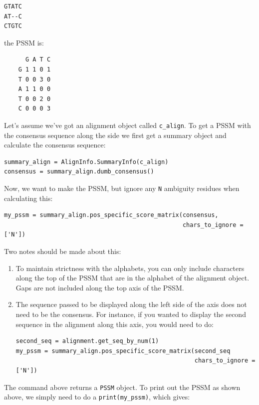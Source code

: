 \documentclass{report}
\begin{document}
\begin{verbatim}
GTATC
AT--C
CTGTC
\end{verbatim}

\noindent the PSSM is:

\begin{verbatim}
      G A T C
    G 1 1 0 1
    T 0 0 3 0
    A 1 1 0 0
    T 0 0 2 0
    C 0 0 0 3
\end{verbatim}

Let's assume we've got an alignment object called \verb|c_align|. To get a PSSM with the consensus sequence along the side we first get a summary object and calculate the consensus sequence:

\begin{verbatim}
summary_align = AlignInfo.SummaryInfo(c_align)
consensus = summary_align.dumb_consensus()
\end{verbatim}

Now, we want to make the PSSM, but ignore any \verb|N| ambiguity residues when calculating this:

\begin{verbatim}
my_pssm = summary_align.pos_specific_score_matrix(consensus,
                                                  chars_to_ignore = ['N'])
\end{verbatim}

Two notes should be made about this:

\begin{enumerate}
  \item To maintain strictness with the alphabets, you can only include characters along the top of the PSSM that are in the alphabet of the alignment object. Gaps are not included along the top axis of the PSSM.

  \item The sequence passed to be displayed along the left side of the axis does not need to be the consensus. For instance, if you wanted to display the second sequence in  the alignment along this axis, you would need to do:

\begin{verbatim}
second_seq = alignment.get_seq_by_num(1)
my_pssm = summary_align.pos_specific_score_matrix(second_seq
                                                  chars_to_ignore = ['N'])
\end{verbatim}

\end{enumerate}

The command above returns a \verb|PSSM| object.
To print out the PSSM as shown above,
we simply need to do a \verb|print(my_pssm)|, which gives:
\end{document}
